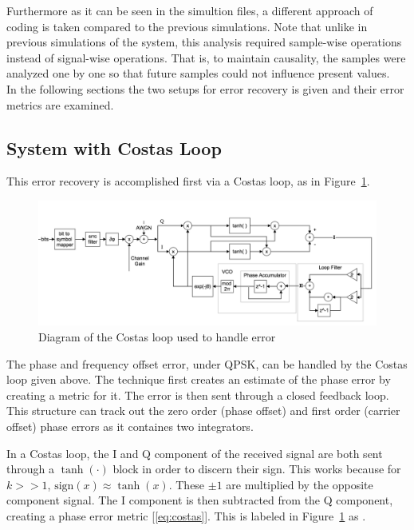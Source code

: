 \documentclass[]{article}
\newcommand{\rom}[1]{\uppercase\expandafter{\romannumeral#1}}
\begin{document}
Furthermore as it can be seen in the simultion files, a different approach of coding is taken compared to the previous simulations. Note that unlike in previous simulations of the system, this analysis required sample-wise operations instead of signal-wise operations. That is, to maintain causality, the samples were analyzed one by one so that future samples could not influence present values.\\

In the following sections the two setups for error recovery is given and their error metrics are examined.


\newpage

\subsection{System with Costas Loop}
This error recovery is accomplished first via a Costas loop, as in Figure~\ref{fig:costas}. 

\begin{figure}[H]
\centering
\includegraphics[width=\textwidth]{costas.png}
\caption{Diagram of the Costas loop used to handle error\label{fig:costas}}
\end{figure}

The phase and frequency offset error, under QPSK, can be handled by the Costas loop given above. The technique first creates an estimate of the phase error by creating a metric for it.  The error is then sent through a closed feedback loop.  This structure can track out the zero order (phase offset) and first order (carrier offset) phase errors as it containes two integrators. 

In a Costas loop, the I and Q component of the received signal are both sent through a $\tanh\left(\cdot\right)$ block in order to discern their sign.  This works because for $k>>1$, $\text{sign}\left(x\right) \approx \tanh \left(x\right)$.  These $\pm1$ are multiplied by the opposite component signal.  The I component is then subtracted from the Q component, creating a phase error metric [\ref{eq:costas}].  This is labeled in Figure~\ref{fig:costas} as \rom{1}. 
\end{document}
